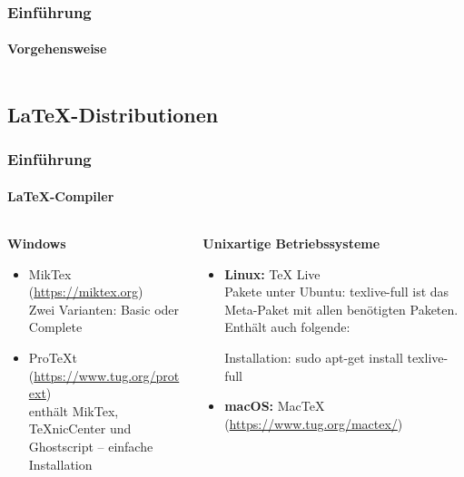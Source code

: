 \begin{frame}
\frametitle{Einführung}
\framesubtitle{Vorgehensweise}
\begin{columns}[onlytextwidth]
\begin{column}{0.40\textwidth}
\end{column}
\begin{column}{0.25\textwidth}
\end{column}
\begin{column}{0.25\textwidth}
\end{column}
\end{columns}
\end{frame}




\subsection{\LaTeX-Distributionen}
\begin{frame}
\frametitle{Einführung}
\framesubtitle{\LaTeX -Compiler}
\begin{columns}[t]
\begin{column}{.4\textwidth}
\textbf{Windows}\\
\begin{itemize}
  \item MikTex (\url{https://miktex.org})\\
   Zwei Varianten: Basic oder Complete
  \item ProTeXt (\url{https://www.tug.org/protext})\\
   enthält MikTex, TeXnicCenter und Ghostscript – einfache Installation\\
\end{itemize}
\end{column}
\begin{column}{.6\textwidth}
\textbf{Unixartige Betriebssysteme}
\begin{itemize}
  \item \textbf{Linux:} TeX Live\\
Pakete unter Ubuntu: {\ttfamily texlive-full} ist das Meta-Paket mit allen
ben\"otigten Paketen. Enthält auch folgende:
Installation: {\ttfamily sudo apt-get install texlive-full}
\item \textbf{macOS:} MacTeX (\url{https://www.tug.org/mactex/})\\
\end{itemize}
\end{column}
\end{columns}
\end{frame}

